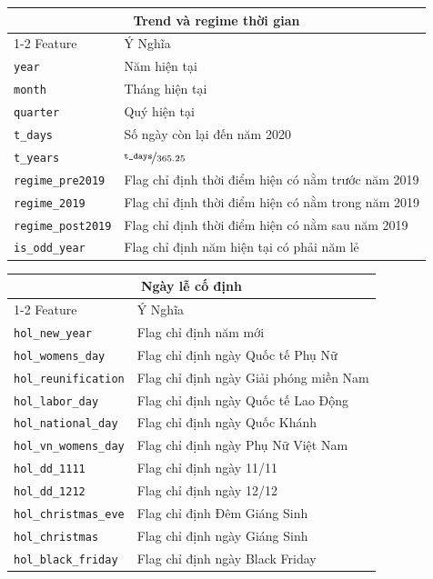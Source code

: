 \documentclass{article}
\begin{document}
\begin{appendices}
\begin{table}[h]
    \centering
    \begin{tabular}{ll}
        \toprule
        \multicolumn{2}{c}{Trend và regime thời gian} \\
        \cmidrule(r){1-2}
        Feature & Ý Nghĩa \\
        \midrule
        \texttt{year} & Năm hiện tại\\
        \texttt{month} & Tháng hiện tại\\
        \texttt{quarter} & Quý hiện tại\\
        \texttt{t\_days} & Số ngày còn lại đến năm 2020\\
        \texttt{t\_years} & $\nicefrac{\texttt{t\_days}}{365.25}$\\
        \texttt{regime\_pre2019} & Flag chỉ định thời điểm hiện có nằm trước năm 2019\\
        \texttt{regime\_2019} & Flag chỉ định thời điểm hiện có nằm trong năm 2019\\
        \texttt{regime\_post2019} & Flag chỉ định thời điểm hiện có nằm sau năm 2019\\
        \texttt{is\_odd\_year} & Flag chỉ định năm hiện tại có phải năm lẻ\\
        \bottomrule
    \end{tabular}
\end{table}

\begin{table}[h]
    \centering
    \begin{tabular}{ll}
        \toprule
        \multicolumn{2}{c}{Ngày lễ cố định} \\
        \cmidrule(r){1-2}
        Feature & Ý Nghĩa \\
        \midrule
        \texttt{hol\_new\_year} & Flag chỉ định năm mới\\
        \texttt{hol\_womens\_day} & Flag chỉ định ngày Quốc tế Phụ Nữ\\
        \texttt{hol\_reunification} & Flag chỉ định ngày Giải phóng miền Nam\\
        \texttt{hol\_labor\_day} & Flag chỉ định ngày Quốc tế Lao Động\\
        \texttt{hol\_national\_day} & Flag chỉ định ngày Quốc Khánh\\
        \texttt{hol\_vn\_womens\_day} & Flag chỉ định ngày Phụ Nữ Việt Nam\\
        \texttt{hol\_dd\_1111} & Flag chỉ định ngày 11/11\\
        \texttt{hol\_dd\_1212} & Flag chỉ định ngày 12/12\\
        \texttt{hol\_christmas\_eve} & Flag chỉ định Đêm Giáng Sinh\\
        \texttt{hol\_christmas} & Flag chỉ định ngày Giáng Sinh\\
        \texttt{hol\_black\_friday} & Flag chỉ định ngày Black Friday\\
        \bottomrule
    \end{tabular}
\end{table}


\end{appendices}
\end{document}
